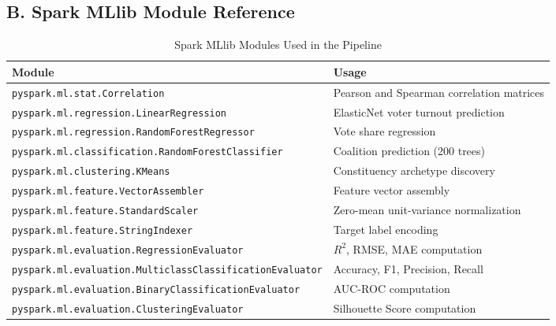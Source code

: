 \documentclass[12pt, a4paper]{article}
\begin{document}
\subsection*{B. Spark MLlib Module Reference}

\begin{table}[H]
\centering
\caption{Spark MLlib Modules Used in the Pipeline}
\small
\begin{tabularx}{\textwidth}{l X}
\toprule
\textbf{Module} & \textbf{Usage} \\
\midrule
\texttt{pyspark.ml.stat.Correlation} & Pearson and Spearman correlation matrices \\
\texttt{pyspark.ml.regression.LinearRegression} & ElasticNet voter turnout prediction \\
\texttt{pyspark.ml.regression.RandomForestRegressor} & Vote share regression \\
\texttt{pyspark.ml.classification.RandomForestClassifier} & Coalition prediction (200 trees) \\
\texttt{pyspark.ml.clustering.KMeans} & Constituency archetype discovery \\
\texttt{pyspark.ml.feature.VectorAssembler} & Feature vector assembly \\
\texttt{pyspark.ml.feature.StandardScaler} & Zero-mean unit-variance normalization \\
\texttt{pyspark.ml.feature.StringIndexer} & Target label encoding \\
\texttt{pyspark.ml.evaluation.RegressionEvaluator} & $R^2$, RMSE, MAE computation \\
\texttt{pyspark.ml.evaluation.MulticlassClassificationEvaluator} & Accuracy, F1, Precision, Recall \\
\texttt{pyspark.ml.evaluation.BinaryClassificationEvaluator} & AUC-ROC computation \\
\texttt{pyspark.ml.evaluation.ClusteringEvaluator} & Silhouette Score computation \\
\bottomrule
\end{tabularx}
\end{table}
\end{document}

